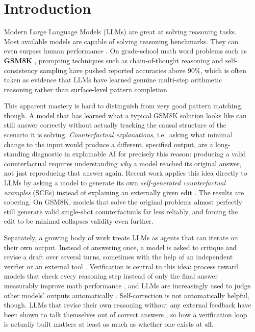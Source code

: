 \documentclass[twoside,twocolumn,10pt]{article}
\begin{document}
\section{Introduction}
\fontsize{11}{13}\selectfont
Modern Large Language Models (LLMs) are great at solving reasoning tasks. Most available models are capable of solving reasoning benchmarks. They can even surpass human performance \cite{Luo_2024}. On grade-school math word problems such as \textbf{GSM8K} \cite{cobbe2021trainingverifiers}, prompting techniques such as chain-of-thought reasoning and self-consistency sampling \cite{wang2022selfconsistency} have pushed reported accuracies above 90\%, which is often taken as evidence that LLMs have learned genuine multi-step arithmetic reasoning rather than surface-level pattern completion.

This apparent mastery is hard to distinguish from very good pattern matching, though. A model that has learned what a typical GSM8K solution looks like can still answer correctly without actually tracking the causal structure of the scenario it is solving. \textit{Counterfactual explanations}, i.e.\ asking what minimal change to the input would produce a different, specified output, are a long-standing diagnostic in explainable AI for precisely this reason: producing a valid counterfactual requires understanding \emph{why} a model reached its original answer, not just reproducing that answer again. Recent work applies this idea directly to LLMs by asking a model to generate its own \textit{self-generated counterfactual examples} (SCEs) instead of explaining an externally given edit \cite{dehghanighobadi2025llmsexplaincounterfactually,mayne2025llmsdontknowdecision}. The results are sobering. On GSM8K, models that solve the original problems almost perfectly still generate valid single-shot counterfactuals far less reliably, and forcing the edit to be minimal collapses validity even further.

Separately, a growing body of work treats LLMs as agents that can iterate on their own output. Instead of answering once, a model is asked to critique and revise a draft over several turns, sometimes with the help of an independent verifier or an external tool \cite{madaan2023selfrefine,shinn2023reflexion,gou2023critic}. Verification is central to this idea: process reward models that check every reasoning step instead of only the final answer measurably improve math performance \cite{lightman2023letsverify}, and LLMs are increasingly used to judge other models' outputs automatically \cite{zheng2023judging}. Self-correction is not automatically helpful, though. LLMs that revise their own reasoning without any external feedback have been shown to talk themselves out of correct answers \cite{huang2023llmscannotselfcorrect}, so how a verification loop is actually built matters at least as much as whether one exists at all.
\end{document}
